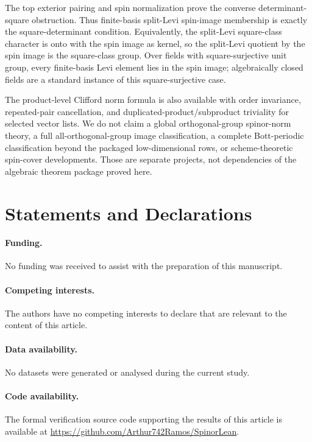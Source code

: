 \documentclass{birkjour}
\theoremstyle{plain}
\theoremstyle{definition}
\theoremstyle{remark}
\begin{document}
The top exterior pairing and spin normalization prove the converse
determinant-square obstruction. Thus finite-basis split-Levi spin-image
membership is exactly the square-determinant condition. Equivalently, the
split-Levi square-class character is onto with the spin image as kernel, so the
split-Levi quotient by the spin image is the square-class group. Over fields
with square-surjective unit group, every finite-basis Levi element lies in the
spin image; algebraically closed fields are a standard instance of this
square-surjective case.

The product-level Clifford norm formula is also available with order
invariance, repeated-pair cancellation, and duplicated-product/subproduct
triviality for selected vector lists. We do not claim a global
orthogonal-group spinor-norm theory, a full all-orthogonal-group image
classification, a complete Bott-periodic classification beyond the packaged
low-dimensional rows, or scheme-theoretic spin-cover developments. Those are
separate projects, not dependencies of the algebraic theorem package proved
here.

\section*{Statements and Declarations}

\paragraph{Funding.}
No funding was received to assist with the preparation of this manuscript.

\paragraph{Competing interests.}
The authors have no competing interests to declare that are relevant to the
content of this article.

\paragraph{Data availability.}
No datasets were generated or analysed during the current study.

\paragraph{Code availability.}
The formal verification source code supporting the results of this article is
available at \url{https://github.com/Arthur742Ramos/SpinorLean}.
\end{document}
